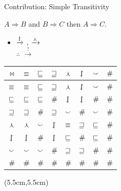 \def\joinTable#1{
  \begin{tabular}{|c||c|c|c|c|c|c|c|}
    \hline
    $\bowtie$ & $\equivalent$ & $\forward$ & $\reverse$ & $\negate$ & $\alternate$ & $\cover$ & $\independent$ \\
    \hline
    $\equivalent$ & $\equivalent$ & $\forward$ & $\reverse$ & $\negate$ & $\alternate$ & $\cover$ & $\independent$ \\
    $\forward$ & $\forward$ & $\forward$ & $\independent$ & $\alternate$ & $\alternate$ & $\independent$ & $\independent$ \\
    $\reverse$ & $\reverse$ & $\independent$ & $\reverse$ & $\cover$ & $\independent$ & $\cover$ & $\independent$  \\
    $\negate$ & $\negate$ & $\cover$ & $\alternate$ & $\equivalent$ & $\reverse$ & $\forward$ & $\independent$  \\
    $\alternate$ & $\alternate$ & $\independent$ & $\alternate$ & \textcolor<#1-#1>{darkred}{$\forward$} & $\independent$ & $\forward$ & $\independent$  \\
    $\cover$ & $\cover$ & $\cover$ & $\independent$ & $\reverse$ & $\reverse$ & $\independent$ & $\independent$  \\
    $\independent$ & $\independent$ & $\independent$ & $\independent$ & $\independent$ & $\independent$ & $\independent$ & $\independent$ \\
    \hline
	\end{tabular}
}

\def\title{Contribution: Simple Transitivity}
\begin{frame}{\title}

   $A \Rightarrow B$ and $B \Rightarrow C$ then $A \Rightarrow C$. \\
  \vspace{0.5cm}
  \pause
  \begin{itemize}
    \item 
       $\xrightarrow{\downharpoonleft\hspace{-1.25mm}\upharpoonright}$ , \hspace{0.5cm}
       $\xrightarrow{\curlywedge}$  \\
      $\therefore$  \hspace{0.1cm}
       $\xrightarrow{?}$ 
  \end{itemize}
  \pause

  \begin{center}
    \joinTable{4}
  \end{center}
  \pause
  \pause

  \begin{textblock*}{2cm}(5.5cm,5.5cm)
  \end{textblock*}
\end{frame}

